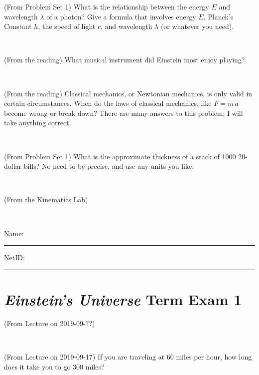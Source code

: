 \documentclass[12pt, letterpaper]{article}
\begin{document}
\begin{problem} (From Problem Set 1)
What is the relationship between the energy $E$ and wavelength
$\lambda$ of a photon? Give a formula that involves energy $E$,
Planck's Constant $h$, the speed of light $c$, and wavelength
$\lambda$ (or whatever you need).
\end{problem}

\vfill ~


\clearpage


\begin{problem} (From the reading)
What musical instrument did Einstein most enjoy playing?
\end{problem}


\vfill ~

\begin{problem} (From the reading)
Classical mechanics, or Newtonian mechanics, is only valid in certain
circumstances. When do the laws of classical mechanics, like $F =
m\,a$ become wrong or break down? There are many answers to this
problem; I will take anything correct.
\end{problem}


\vfill ~

\begin{problem} (From Problem Set 1)
What is the approximate thickness of a stack of 1000 20-dollar bills?
No need to be precise, and use any units you like.
\end{problem}


\vfill ~

\begin{problem} (From the Kinematics Lab)

\end{problem}


\vfill ~


\cleardoublepage



\noindent
Name: \rule[-1ex]{0.60\textwidth}{0.1pt}
NetID: \rule[-1ex]{0.20\textwidth}{0.1pt}

\section*{\textsl{Einstein's Universe} Term Exam 1}
\setcounter{problem}{1}


\begin{problem} (From Lecture on 2019-09-??)
\end{problem}


\vfill ~

\begin{problem} (From Lecture on 2019-09-17)
If you are traveling at 60 miles per hour, how long does
it take you to go 300 miles?
\end{problem}
\end{document}
